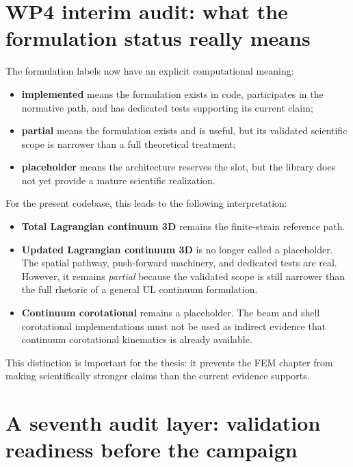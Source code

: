 \section{WP4 interim audit: what the formulation status really means}

The formulation labels now have an explicit computational meaning:
\begin{itemize}
  \item \textbf{implemented} means the formulation exists in code, participates
  in the normative path, and has dedicated tests supporting its current claim;
  \item \textbf{partial} means the formulation exists and is useful, but its
  validated scientific scope is narrower than a full theoretical treatment;
  \item \textbf{placeholder} means the architecture reserves the slot, but the
  library does not yet provide a mature scientific realization.
\end{itemize}

For the present codebase, this leads to the following interpretation:
\begin{itemize}
  \item \textbf{Total Lagrangian continuum 3D} remains the finite-strain
  reference path.
  \item \textbf{Updated Lagrangian continuum 3D} is no longer called a
  placeholder.  The spatial pathway, push-forward machinery, and dedicated
  tests are real.  However, it remains \emph{partial} because the validated
  scope is still narrower than the full rhetoric of a general UL continuum
  formulation.
  \item \textbf{Continuum corotational} remains a placeholder.  The beam and
  shell corotational implementations must not be used as indirect evidence that
  continuum corotational kinematics is already available.
\end{itemize}

This distinction is important for the thesis: it prevents the FEM chapter from
making scientifically stronger claims than the current evidence supports.

\section{A seventh audit layer: validation readiness before the campaign}

